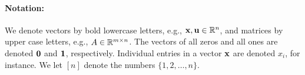 
\paragraph{Notation:}
We denote vectors by bold lowercase letters, e.g., $\mathbf{x}, \mathbf{u} \in \mathbb{R}^n$, and matrices by upper case letters, e.g., $A \in \mathbb{R}^{m \times n}$.
The vectors of all zeros and all ones are denoted $\mathbf{0}$ and $\mathbf{1}$, respectively.
Individual entries in a vector $\mathbf{x}$ are denoted $x_i$, for instance.
We let $[n]$ denote the numbers $\{1,2,\dots,n\}$.
